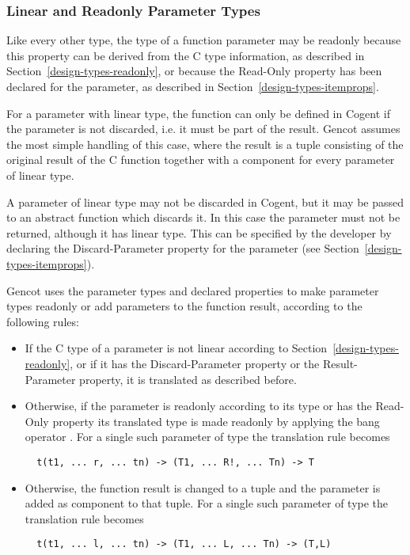 \subsubsection{Linear and Readonly Parameter Types}

Like every other type, the type of a function parameter may be readonly because this property can be derived
from the C type information, as described in Section~\ref{design-types-readonly}, or because the Read-Only property
has been declared for the parameter, as described in Section~\ref{design-types-itemprops}.

For a parameter with linear type, the function can only be defined in Cogent if the parameter is not discarded,
i.e. it must be part of the result. Gencot assumes the most simple handling of this case, where the result
is a tuple consisting of the original result of the C function together with a component for every parameter
of linear type. 

A parameter of linear type may not be discarded in Cogent, but it may be passed to an abstract function which discards
it. In this case the parameter must not be returned, although it has linear type. This can be specified by the 
developer by declaring the Discard-Parameter property for the parameter (see Section~\ref{design-types-itemprops}).

Gencot uses the parameter types and declared properties to make parameter types readonly or
add parameters to the function result, according to the following rules:
\begin{itemize}
\item If the C type of a parameter is not linear according to Section~\ref{design-types-readonly}, or if it
has the Discard-Parameter property or the Result-Parameter property, it is translated as described before.
\item Otherwise, if the parameter is readonly according to its type or has the Read-Only property
its translated type is made readonly by applying the
bang operator \code{!}. For a single such parameter of type  the translation rule becomes
\begin{verbatim}
  t(t1, ... r, ... tn) -> (T1, ... R!, ... Tn) -> T
\end{verbatim}
\item Otherwise, the function result is changed to a tuple and the parameter is added as component to that tuple.
For a single such parameter of type  the translation rule becomes
\begin{verbatim}
  t(t1, ... l, ... tn) -> (T1, ... L, ... Tn) -> (T,L)
\end{verbatim}
\end{itemize}


